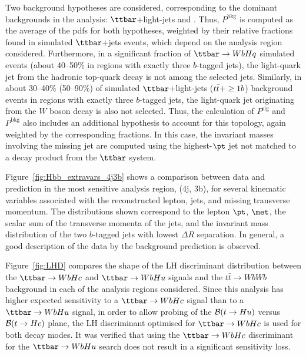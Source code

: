 Two background hypotheses are considered, corresponding to the dominant backgrounds in
the analysis: $\ttbar$+light-jets and \ttbin. Thus, $P^\textrm{bkg}$ is computed as the average of
the pdfs for both hypotheses, weighted by their relative fractions found in simulated $\ttbar$+jets events, which depend
on the analysis region considered. Furthermore, in a significant fraction of $\Hq$ simulated events (about 40--50\% in regions with exactly three $b$-tagged jets), 
the light-quark jet from the hadronic top-quark decay is not among the selected jets.
Similarly, in about 30--40\% (50--90\%) of simulated $\ttbar$+light-jets ($t\bar{t}+\geq1b$) background events in regions with exactly three $b$-tagged jets, 
the light-quark jet originating from the $W$ boson decay is also not selected. Thus, the calculation of $P^\textrm{sig}$ and
$P^\textrm{bkg}$ also includes an additional hypothesis to account for this topology, again weighted by the corresponding fractions. 
In this case, the invariant masses involving the missing jet are computed using the highest-$\pt$ jet not matched 
to a decay product from the $\ttbar$ system.


Figure~\ref{fig:Hbb_extravars_4j3b} shows a comparison between data and prediction in the most sensitive analysis region, (4j, 3b), 
for several kinematic variables associated with the reconstructed lepton, jets, and missing transverse momentum. 
The distributions shown correspond to the lepton $\pt$, $\met$, the scalar sum of the transverse momenta of 
the jets, and the invariant mass distribution of the two $b$-tagged jets with lowest $\Delta R$ separation.
In general, a good description of the data by the background prediction is observed.

Figure~\ref{fig:LHD} compares the shape of the LH discriminant distribution between the $\Hc$ and $\Hu$ signals and the 
$t\bar{t}\to WbWb$ background in each of the analysis regions considered.
Since this analysis has higher expected sensitivity to a $\Hc$ signal than to a $\Hu$ signal, in order to allow probing 
of the $\mathcal{B}(t\to Hu)$ versus $\mathcal{B}(t\to Hc)$ plane, the LH discriminant optimised for $\Hc$ is used for both 
decay modes. It was verified that using the $\Hc$ discriminant for the $\Hu$ search does not result in a significant sensitivity loss.

